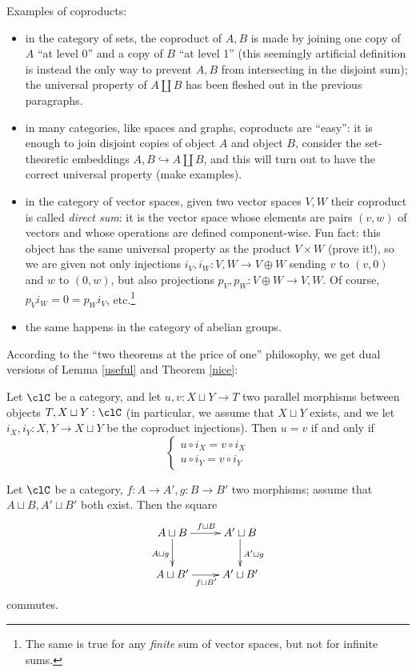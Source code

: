 \documentclass[11pt]{article}
\begin{document}
Examples of coproducts:
\begin{itemize}
	\item in the category of sets, the coproduct of $A,B$ is made by joining one copy of $A$ ``at level 0'' and a copy of $B$ ``at level 1'' (this seemingly artificial definition is instead the only way to prevent $A,B$ from intersecting in the disjoint sum); the universal property of $A\coprod B$ has been fleshed out in the previous paragraphs.
	\item in many categories, like spaces and graphs, coproducts are ``easy'': it is enough to join disjoint copies of object \(A\) and object \(B\), consider the set-theoretic embeddings $A , B \hookrightarrow A\coprod B$, and this will turn out to have the correct universal property (make examples).
	\item in the category of vector spaces, given two vector spaces $V,W$ their coproduct is called \emph{direct sum}: it is the vector space whose elements are pairs $(v,w)$ of vectors and whose operations are defined component-wise. Fun fact: this object has the same universal property as the product $V\times W$ (prove it!), so we are given not only injections $i_V,i_W : V,W\to V\oplus W$ sending $v$ to $(v,0)$ and $w$ to $(0,w)$, but also projections $p_V,p_W : V\oplus W \to V,W$. Of course, $p_Vi_W=0=p_Wi_V$, etc.\footnote{The same is true for any \emph{finite} sum of vector spaces, but not for infinite sums.}
	\item the same happens in the category of abelian groups.
\end{itemize}
According to the ``two theorems at the price of one'' philosophy, we get dual versions of Lemma \ref{useful} and Theorem \ref{nice}:
\begin{lemma}
	Let $\clC$ be a category, and let $u,v : X\sqcup Y \to T$ two parallel morphisms between objects $T, X\sqcup Y : \clC$ (in particular, we assume that $X\sqcup Y$ exists, and we let $i_X,i_Y : X,Y\to X\sqcup Y$ be the coproduct injections). Then $u=v$ if and only if
	\begin{equation*}
		\begin{cases}
			u \circ i_X= v\circ i_X \\
			 u\circ i_Y =  v\circ i_Y
		\end{cases}
	\end{equation*}
\end{lemma}
\begin{theorem}
	Let $\clC$ be a category, $f : A \to A', g : B\to B'$ two morphisms; assume that $A\sqcup B, A'\sqcup B'$ both exist. Then the square
	\[
		\vcenter{\xymatrix{
				A\sqcup B\ar[d]_{A\sqcup g}\ar[r]^{f\sqcup B} & A^\prime\sqcup B \ar[d]^{A^\prime\sqcup g}\\
				A\sqcup B^\prime \ar[r]_{f\sqcup B^\prime}& A^\prime\sqcup B^\prime
			}}
	\]
	commutes.
\end{theorem}
\end{document}
